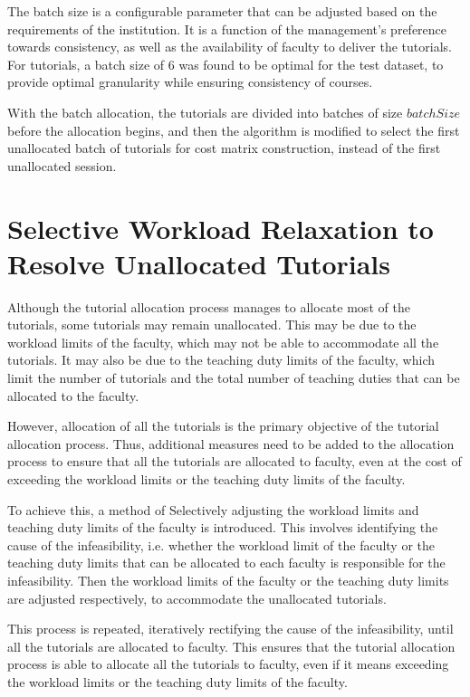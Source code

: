 The batch size is a configurable parameter that can be adjusted based on the requirements of the institution. It is a function of the management's preference towards consistency, as well as the availability of faculty to deliver the tutorials. For tutorials, a batch size of 6 was found to be optimal for the test dataset, to provide optimal granularity while ensuring consistency of courses.

With the batch allocation, the tutorials are divided into batches of size $batchSize$ before the allocation begins, and then the algorithm is modified to select the first unallocated batch of tutorials for cost matrix construction, instead of the first unallocated session.


\section{Selective Workload Relaxation to Resolve Unallocated Tutorials}

Although the tutorial allocation process manages to allocate most of the tutorials, some tutorials may remain unallocated. This may be due to the workload limits of the faculty, which may not be able to accommodate all the tutorials. It may also be due to the teaching duty limits of the faculty, which limit the number of tutorials and the total number of teaching duties that can be allocated to the faculty.

However, allocation of all the tutorials is the primary objective of the tutorial allocation process. Thus, additional measures need to be added to the allocation process to ensure that all the tutorials are allocated to faculty, even at the cost of exceeding the workload limits or the teaching duty limits of the faculty.

To achieve this, a method of Selectively adjusting the workload limits and teaching duty limits of the faculty is introduced. This involves identifying the cause of the infeasibility, i.e. whether the workload limit of the faculty or the teaching duty limits that can be allocated to each faculty is responsible for the infeasibility. Then the workload limits of the faculty or the teaching duty limits are adjusted respectively, to accommodate the unallocated tutorials.

This process is repeated, iteratively rectifying the cause of the infeasibility, until all the tutorials are allocated to faculty. This ensures that the tutorial allocation process is able to allocate all the tutorials to faculty, even if it means exceeding the workload limits or the teaching duty limits of the faculty.


